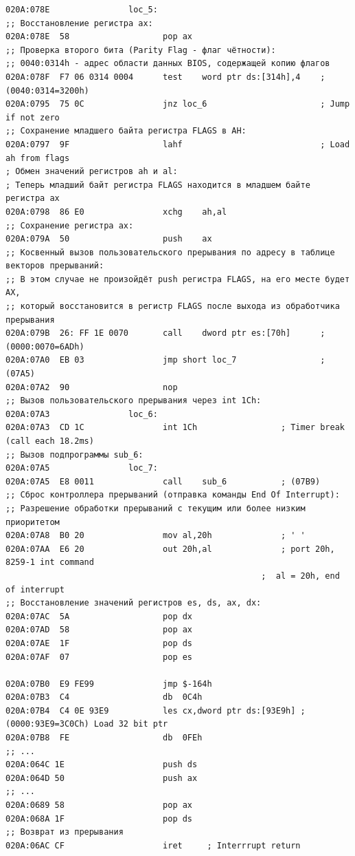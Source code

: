 \documentclass[a4paper,14pt]{article}
\begin{document}
\begin{lstlisting}[style={asm}]
020A:078E				 loc_5:
;; Восстановление регистра ax:
020A:078E  58					pop	ax
;; Проверка второго бита (Parity Flag - флаг чётности):
;; 0040:0314h - адрес области данных BIOS, содержащей копию флагов
020A:078F  F7 06 0314 0004		test	word ptr ds:[314h],4	; (0040:0314=3200h)
020A:0795  75 0C				jnz	loc_6						; Jump if not zero
;; Сохранение младшего байта регистра FLAGS в AH:
020A:0797  9F					lahf							; Load ah from flags
; Обмен значений регистров ah и al: 
; Теперь младший байт регистра FLAGS находится в младшем байте регистра ax
020A:0798  86 E0				xchg	ah,al
;; Сохранение регистра ax:
020A:079A  50					push	ax
;; Косвенный вызов пользовательского прерывания по адресу в таблице векторов прерываний:
;; В этом случае не произойдёт push регистра FLAGS, на его месте будет AX, 
;; который восстановится в регистр FLAGS после выхода из обработчика прерывания
020A:079B  26: FF 1E 0070		call	dword ptr es:[70h]		; (0000:0070=6ADh)
020A:07A0  EB 03				jmp	short loc_7					; (07A5)
020A:07A2  90					nop
;; Вызов пользовательского прерывания через int 1Ch:
020A:07A3				 loc_6:
020A:07A3  CD 1C				int	1Ch					; Timer break (call each 18.2ms)
;; Вызов подпрограммы sub_6:
020A:07A5				 loc_7:
020A:07A5  E8 0011				call	sub_6			; (07B9)
;; Сброс контроллера прерываний (отправка команды End Of Interrupt):
;; Разрешение обработки прерываний с текущим или более низким приоритетом
020A:07A8  B0 20				mov	al,20h				; ' '
020A:07AA  E6 20				out	20h,al				; port 20h, 8259-1 int command
													;  al = 20h, end of interrupt
;; Восстановление значений регистров es, ds, ax, dx:					
020A:07AC  5A					pop	dx
020A:07AD  58					pop	ax
020A:07AE  1F					pop	ds
020A:07AF  07					pop	es

020A:07B0  E9 FE99				jmp	$-164h
020A:07B3  C4					db	0C4h
020A:07B4  C4 0E 93E9			les	cx,dword ptr ds:[93E9h]	; (0000:93E9=3C0Ch) Load 32 bit ptr
020A:07B8  FE					db	0FEh
;; ...
020A:064C 1E   					push ds
020A:064D 50					push ax
;; ...
020A:0689 58 					pop ax
020A:068A 1F  					pop ds
;; Возврат из прерывания
020A:06AC CF					iret     ; Interrrupt return						
\end{lstlisting}
\clearpage
\end{document}

